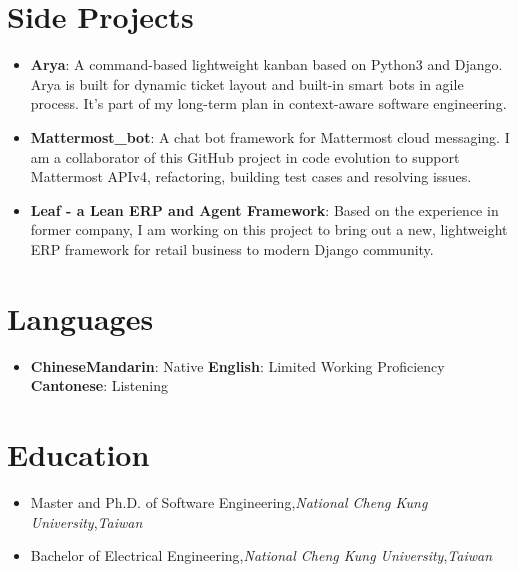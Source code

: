 \documentclass[a4paper,11pt]{article}
\newcommand{\resumeItem}[2]{
  \item{
    \textbf{\small#1}{: \small#2 \vspace{-2pt}}
  }
}
\newcommand{\resumeEducationItem}[3]{
  \vspace{-1pt}\item
    {#1}{,}\hspace{4pt}\textit{#2}{,}\hspace{4pt}\textit{#3}\vspace{-6pt}
}
\newcommand{\resumeSubItem}[2]{\resumeItem{#1}{#2}\vspace{-4pt}}
\newcommand{\resumeSubHeadingListStart}{\begin{itemize}[leftmargin=*]}
\newcommand{\resumeSubHeadingListEnd}{\end{itemize}}
\newcommand\smalldiv{\smash{\raisebox{0.29ex}{\scalebox{0.8}{/}}}}
\begin{document}
\section{Side Projects}
  \resumeSubHeadingListStart
    \resumeSubItem{Arya}
      {A command-based lightweight kanban based on Python3 and Django. Arya is built for dynamic ticket layout and built-in smart bots in agile process. It's part of my long-term plan in context-aware software engineering.}
    \resumeSubItem{Mattermost\_bot}
      {A chat bot framework for Mattermost cloud messaging. I am a collaborator of this GitHub project in code evolution to support Mattermost APIv4, refactoring, building test cases and resolving issues.}
    \resumeSubItem{Leaf - a Lean ERP and Agent Framework}
      {Based on the experience in former company, I am working on this project to bring out a new, lightweight ERP framework for retail business to modern Django community.}
  \resumeSubHeadingListEnd

\section{Languages}
  \resumeSubHeadingListStart
    \item{
      \textbf{Chinese\smalldiv Mandarin}{: Native}
      \hspace{5pt}
      \textbf{English}{: Limited Working Proficiency}
      \hspace{5pt}
      \textbf{Cantonese}{: Listening}
    }
  \resumeSubHeadingListEnd

\section{Education}
  \resumeSubHeadingListStart
    \resumeEducationItem
      {Master and Ph.D. of Software Engineering}{National Cheng Kung University}{Taiwan}
    \resumeEducationItem
      {Bachelor of Electrical Engineering}{National Cheng Kung University}{Taiwan}
  \resumeSubHeadingListEnd

%


\end{document}
